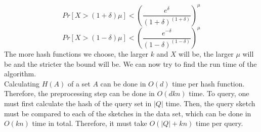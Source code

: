 $$Pr[X > (1+\delta)\mu] < \left(\frac{e^\delta}{(1+\delta)^{(1+\delta)}}\right)^\mu$$
$$Pr[X > (1-\delta)\mu] < \left(\frac{e^{-\delta}}{(1-\delta)^{(1-\delta)}}\right)^\mu$$
The more hash functions we choose, the larger $k$ and $X$ will be, the larger $\mu$ will be and the stricter the bound will be. We can now try to find the run time of the algorithm.\\
Calculating $H(A)$ of a set $A$ can be done in $O(d)$ time per hash function. Therefore, the preprocessing step can be done in $O(dkn)$ time. To query, one must first calculate the hash of the query set in $|Q|$ time. Then, the query sketch must be compared to each of the sketches in the data set, which can be done in $O(kn)$ time in total. Therefore, it must take $O(|Q| + kn)$ time per query.

